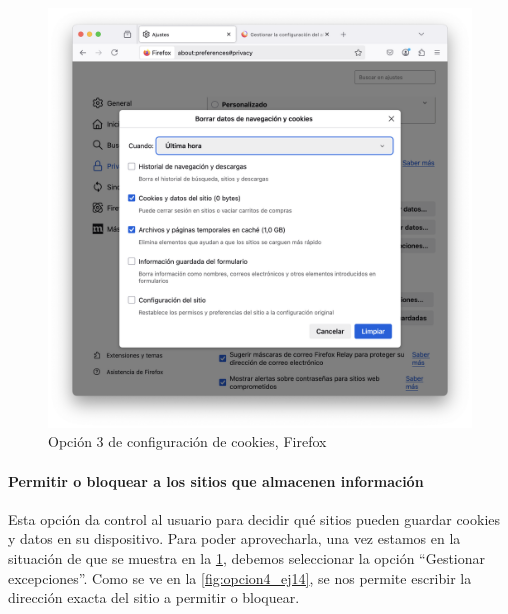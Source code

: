 \begin{figure}[H]   
    \centering
    \includegraphics[width=\textwidth]{opcion3_ej14.png}
    \caption{Opción 3 de configuración de cookies, Firefox}
    \label{fig:opcion3_ej14}
\end{figure}

\paragraph{Permitir o bloquear a los sitios que almacenen información }

Esta opción da control al usuario para decidir qué sitios pueden guardar cookies y datos en su dispositivo. Para poder aprovecharla, una vez estamos en la situación de que se muestra en la \ref{fig:opcion3_ej14}, debemos seleccionar la opción “Gestionar excepciones”. Como se ve en la \ref{fig:opcion4_ej14}, se nos permite escribir la dirección exacta del sitio a permitir o bloquear. 

